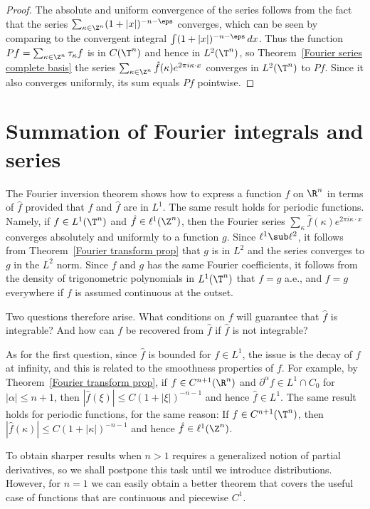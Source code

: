 \begin{proof}
The absolute and uniform convergence of the series follows from the fact
that the series $\sum_{\kappa\in\Z^n}(1+|x|)^{-n-\eps}$ converges, which can be seen by comparing to the convergent integral $\int(1+|x|)^{-n-\eps}\,dx$. Thus the function $Pf=\sum_{\kappa\in\Z^n}\tau_\kappa f$ is in $C(\T^n)$ and hence in $L^2(\T^n)$, so Theorem~\ref{Fourier series complete basis} the series $\sum_{\kappa\in\Z^n}\hat{f}(\kappa)e^{2\pi i\kappa\cdot x}$ converges in $L^2(\T^n)$ to $Pf$. Since it also converges uniformly, its sum equals $Pf$ pointwise.
\end{proof}
\section{Summation of Fourier integrals and series}
The Fourier inversion theorem shows how to express a function $f$ on $\R^n$ in terms of $\hat{f}$ provided that $f$ and $\hat{f}$ are in $L^1$. The same result holds for periodic functions. Namely, if $f\in L^1(\T^n)$ and $\hat{f}\in\ell^1(\Z^n)$, then the Fourier series $\sum_{\kappa}\hat{f}(\kappa)e^{2\pi i\kappa\cdot x}$ converges absolutely and uniformly to a function $g$. Since $\ell^1\sub\ell^2$, it follows from Theorem~\ref{Fourier transform prop} that $g$ is in $L^2$ and the series converges to $g$ in the $L^2$ norm. Since $f$ and $g$ has the same Fourier coefficients, it follows from the density of trigonometric polynomials in $L^1(\T^n)$ that $f=g$ a.e., and $f=g$ everywhere if $f$ is assumed continuous at the outset.\par
Two questions therefore arise. What conditions on $f$ will guarantee that $\hat{f}$ is integrable? And how can $f$ be recovered from $\hat{f}$ if $\hat{f}$ is not integrable?\par
As for the first question, since $\hat{f}$ is bounded for $f\in L^1$, the issue is the decay of $f$ at infinity, and this is related to the smoothness properties of $f$. For example, by Theorem~\ref{Fourier transform prop}, if $f\in C^{n+1}(\R^n)$ and $\partial^\alpha f\in L^1\cap C_0$ for $|\alpha|\leq n+1$, then $|\hat{f}(\xi)|\leq C(1+|\xi|)^{-n-1}$ and hence $\hat{f}\in L^1$. The same result holds for periodic functions, for the same reason: If $f\in C^{n+1}(\T^n)$, then $|\hat{f}(\kappa)|\leq C(1+|\kappa|)^{-n-1}$ and hence $\hat{f}\in\ell^1(\Z^n)$.\par
To obtain sharper results when $n>1$ requires a generalized notion of partial derivatives, so we shall postpone this task until we introduce distributions. However, for $n=1$ we can easily obtain a better theorem that covers the useful case of functions that are continuous and piecewise $C^1$.
